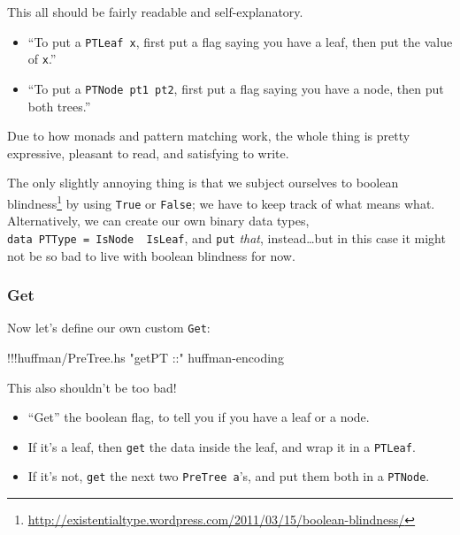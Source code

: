 \documentclass[]{article}
\newenvironment{Shaded}{}{}
\newcommand{\StringTok}[1]{\textcolor[rgb]{0.25,0.44,0.63}{{#1}}}
\newcommand{\FunctionTok}[1]{\textcolor[rgb]{0.02,0.16,0.49}{{#1}}}
\newcommand{\NormalTok}[1]{{#1}}
\renewcommand{\href}[2]{#2\footnote{\url{#1}}}
\begin{document}
This all should be fairly readable and self-explanatory.

\begin{itemize}
\item
  ``To put a \texttt{PTLeaf\ x}, first put a flag saying you have a
  leaf, then put the value of \texttt{x}.''
\item
  ``To put a \texttt{PTNode\ pt1\ pt2}, first put a flag saying you have
  a node, then put both trees.''
\end{itemize}

Due to how monads and pattern matching work, the whole thing is pretty
expressive, pleasant to read, and satisfying to write.

The only slightly annoying thing is that we subject ourselves to
\href{http://existentialtype.wordpress.com/2011/03/15/boolean-blindness/}{boolean
blindness} by using \texttt{True} or \texttt{False}; we have to keep
track of what means what. Alternatively, we can create our own binary
data types, \texttt{data\ PTType\ =\ IsNode\ \textbar{}\ IsLeaf}, and
\texttt{put} \emph{that}, instead\ldots{}but in this case it might not
be so bad to live with boolean blindness for now.

\subsubsection{Get}\label{get}

Now let's define our own custom \texttt{Get}:

\begin{Shaded}
\begin{Highlighting}[]
\FunctionTok{!!!}\NormalTok{huffman}\FunctionTok{/}\NormalTok{PreTree.hs }\StringTok{"getPT ::"} \NormalTok{huffman}\FunctionTok{-}\NormalTok{encoding}
\end{Highlighting}
\end{Shaded}

This also shouldn't be too bad!

\begin{itemize}
\tightlist
\item
  ``Get'' the boolean flag, to tell you if you have a leaf or a node.
\item
  If it's a leaf, then \texttt{get} the data inside the leaf, and wrap
  it in a \texttt{PTLeaf}.
\item
  If it's not, \texttt{get} the next two \texttt{PreTree\ a}'s, and put
  them both in a \texttt{PTNode}.
\end{itemize}
\end{document}
